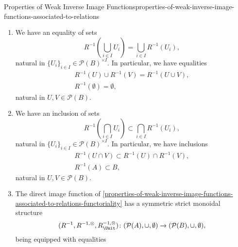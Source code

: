 \begin{proposition}{Properties of Weak Inverse Image Functions}{properties-of-weak-inverse-image-functions-associated-to-relations}
\begin{enumerate}
\begin{itemize}
\begin{itemize}
                    \end{itemize}%
            \end{itemize}
        \item\label{properties-of-weak-inverse-image-functions-associated-to-relations-preservation-of-colimits}We have an equality of sets
            \[
                R^{-1}(\bigcup_{i\in I}U_{i})%
                =%
                \bigcup_{i\in I}R^{-1}(U_{i}),%
            \]%
            natural in $\{U_{i}\}_{i\in I}\in\mathcal{P}(B)^{\times I}$. In particular, we have equalities%
            \[
                \begin{gathered}
                    R^{-1}(U)\cup R^{-1}(V) = R^{-1}(U\cup V),\\
                    R^{-1}(\emptyset)       = \emptyset,
                \end{gathered}
            \]%
            natural in $U,V\in\mathcal{P}(B)$.
        \item\label{properties-of-weak-inverse-image-functions-associated-to-relations-oplax-preservation-of-limits}We have an inclusion of sets
            \[
                R^{-1}(\bigcap_{i\in I}U_{i})%
                \subset%
                \bigcap_{i\in I}R^{-1}(U_{i}),%
            \]%
            natural in $\{U_{i}\}_{i\in I}\in\mathcal{P}(B)^{\times I}$. In particular, we have inclusions%
            \[
                \begin{gathered}
                    R^{-1}(U\cap V) \subset R^{-1}(U)\cap R^{-1}(V),\\
                    R^{-1}(A)       \subset B,
                \end{gathered}
            \]%
            natural in $U,V\in\mathcal{P}(B)$.
        \item\label{properties-of-weak-inverse-image-functions-associated-to-relations-symmetric-strict-monoidality-with-respect-to-unions}The direct image function of \cref{properties-of-weak-inverse-image-functions-associated-to-relations-functoriality} has a symmetric strict monoidal structure
            \[
                (R^{-1},R^{-1,\otimes},R^{-1,\otimes}_{\Unit})
                \colon
                (\mathcal{P}(A),\cup,\emptyset)
                \to
                (\mathcal{P}(B),\cup,\emptyset),
            \]%
            being equipped with equalities%
            \[
                \begin{gathered}

\end{gathered}\]
\end{enumerate}
\end{proposition}
